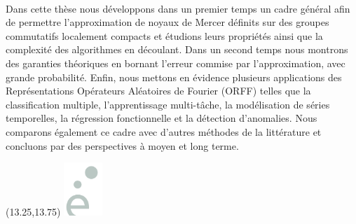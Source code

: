 \begin{textblock}{11.5}
{{\begin{multicols}{2}
        \paragraph{}
        Dans cette th\`ese nous d\'eveloppons dans un premier temps un cadre
        g\'en\'eral afin de permettre l'approximation de noyaux de Mercer
        d\'efinits sur des groupes commutatifs localement compacts et
        \'etudions leurs propri\'et\'es ainsi que la complexit\'e des
        algorithmes en d\'ecoulant. Dans un second temps nous montrons des
        garanties th\'eoriques en bornant l'erreur commise par l'approximation,
        avec grande probabilit\'e. Enfin, nous mettons en \'evidence plusieurs
        applications des Repr\'esentations Op\'erateurs Al\'eatoires de Fourier
        (\acs{ORFF}) telles que la classification multiple, l'apprentissage
        multi-t\^ache, la mod\'elisation de s\'eries temporelles, la
        r\'egression fonctionnelle et la d\'etection d'anomalies. Nous
        comparons \'egalement ce cadre avec d'autres m\'ethodes de la
        litt\'erature et concluons par des perspectives \`a moyen et long
        terme.
    \end{multicols}}}
\end{textblock}

\vspace*{\fill}

\begin{textblock}{13} (13.25,13.75)
    \includegraphics[height=2cm]{../gfx/logoEgrey.png}
\end{textblock}

